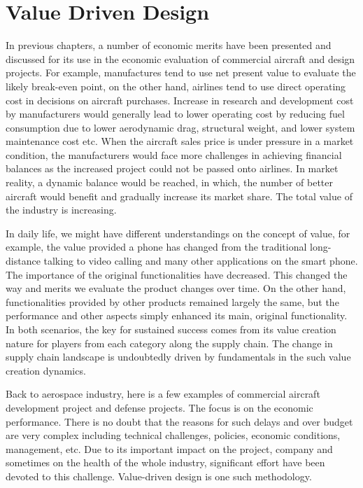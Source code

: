 \chapter{Value Driven Design}\label{chvdd}

In previous chapters, a number of economic merits have been presented and discussed for its use in the economic evaluation of commercial aircraft and design projects. For example, manufactures tend to use net present value to evaluate the likely break-even point, on the other hand, airlines tend to use direct operating cost in decisions on aircraft purchases. Increase in research and development cost by manufacturers would generally lead to lower operating cost by reducing fuel consumption due to lower aerodynamic drag, structural weight, and lower system maintenance cost etc. When the aircraft sales price is under pressure in a market condition, the manufacturers would face more challenges in achieving financial balances as the increased project could not be passed onto airlines. In market reality, a dynamic balance would be reached, in which, the number of better aircraft would benefit and gradually increase its market share. The total value of the industry is increasing. 

In daily life, we might have different understandings on the concept of value, for example, the value provided a phone has changed from the traditional long-distance talking to video calling and many other applications on the smart phone. The importance of the original functionalities have decreased. This changed the way and merits we evaluate the product changes over time. On the other hand, functionalities provided by other products remained largely the same, but the performance and other aspects simply enhanced its main, original functionality. In both scenarios, the key for sustained success comes from its value creation nature for players from each category along the supply chain. The change in supply chain landscape is undoubtedly driven by fundamentals in the such value creation dynamics. 

Back to aerospace industry, here is a few examples of commercial aircraft development project and defense projects. The focus is on the economic performance. There is no doubt that the reasons for such delays and over budget are very complex including technical challenges, policies, economic conditions, management, etc. Due to its important impact on the project, company and sometimes on the health of the whole industry, significant effort have been devoted to this challenge. Value-driven design is one such methodology. 







